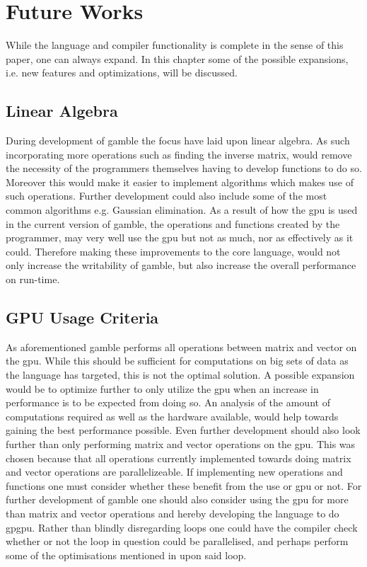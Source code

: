 \chapter{Future Works}\label{cha:future_works}
While the language and compiler functionality is complete in the sense of this paper, one can always expand.
In this chapter some of the possible expansions, i.e. new features and optimizations, will be discussed.

\section{Linear Algebra}\label{improve:LIAL}
During development of \gls{gamble} the focus have laid upon linear algebra.
As such incorporating more operations such as finding the inverse matrix, would remove the necessity of the programmers themselves having to develop functions to do so.
Moreover this would make it easier to implement algorithms which makes use of such operations.
Further development could also include some of the most common algorithms e.g. Gaussian elimination.
As a result of how the \acrshort{gpu} is used in the current version of \gls{gamble}, the operations and functions created by the programmer, may very well use the \acrshort{gpu} but not as much, nor as effectively as it could.
Therefore making these improvements to the core language, would not only increase the writability of \gls{gamble}, but also increase the overall performance on run-time.

\section{GPU Usage Criteria}
As aforementioned \gls{gamble} performs all operations between matrix and vector on the \acrshort{gpu}.
While this should be sufficient for computations on big sets of data as the language has targeted, this is not the optimal solution.
A possible expansion would be to optimize further to only utilize the \acrshort{gpu} when an increase in performance is to be expected from doing so.
An analysis of the amount of computations required as well as the hardware available, would help towards gaining the best performance possible.
Even further development should also look further than only performing matrix and vector operations on the \acrshort{gpu}.
This was chosen because that all operations currently implemented towards doing matrix and vector operations are parallelizeable.
If implementing new operations and functions one must consider whether these benefit from the use or \acrshort{gpu} or not.
For further development of \gls{gamble} one should also consider using the \acrshort{gpu} for more than matrix and vector operations and hereby developing the language to do \gls{gpgpu}. 
Rather than blindly disregarding loops one could have the compiler check whether or not the loop in question could be parallelised, and perhaps perform some of the optimisations mentioned in  upon said loop.
 
